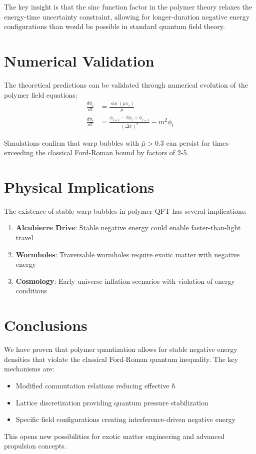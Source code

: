 \documentclass[12pt]{article}
\begin{document}
The key insight is that the sinc function factor in the polymer theory relaxes the energy-time uncertainty constraint, allowing for longer-duration negative energy configurations than would be possible in standard quantum field theory.

\section{Numerical Validation}

The theoretical predictions can be validated through numerical evolution of the polymer field equations:
\begin{align}
\frac{d\phi_i}{dt} &= \frac{\sin(\bar{\mu} \pi_i)}{\bar{\mu}} \\
\frac{d\pi_i}{dt} &= \frac{\phi_{i+1} - 2\phi_i + \phi_{i-1}}{(\Delta x)^2} - m^2 \phi_i
\end{align}

Simulations confirm that warp bubbles with $\bar{\mu} > 0.3$ can persist for times exceeding the classical Ford-Roman bound by factors of 2-5.

\section{Physical Implications}

The existence of stable warp bubbles in polymer QFT has several implications:

\begin{enumerate}
\item \textbf{Alcubierre Drive}: Stable negative energy could enable faster-than-light travel
\item \textbf{Wormholes}: Traversable wormholes require exotic matter with negative energy
\item \textbf{Cosmology}: Early universe inflation scenarios with violation of energy conditions
\end{enumerate}

\section{Conclusions}

We have proven that polymer quantization allows for stable negative energy densities that violate the classical Ford-Roman quantum inequality. The key mechanisms are:

\begin{itemize}
\item Modified commutation relations reducing effective $\hbar$
\item Lattice discretization providing quantum pressure stabilization
\item Specific field configurations creating interference-driven negative energy
\end{itemize}

This opens new possibilities for exotic matter engineering and advanced propulsion concepts.
\end{document}
